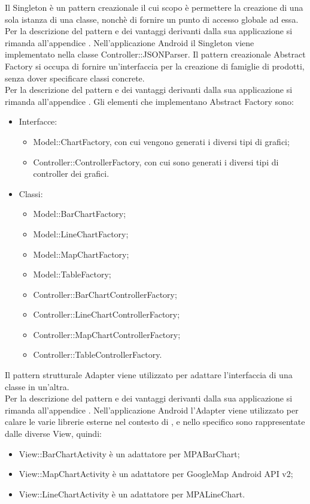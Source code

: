 	Il Singleton è un pattern creazionale il cui scopo è permettere la creazione di una sola istanza di una classe, nonchè di fornire un punto di accesso globale ad essa.\\
	Per la descrizione del pattern e dei vantaggi derivanti dalla sua applicazione si rimanda all'appendice .
	Nell'applicazione Android il Singleton viene implementato nella classe Controller::JSONParser.
	Il pattern creazionale Abstract Factory si occupa di fornire un'interfaccia per la creazione di famiglie di prodotti, senza dover specificare classi concrete. \\
	Per la descrizione del pattern e dei vantaggi derivanti dalla sua applicazione si rimanda all'appendice .
	Gli elementi che implementano Abstract Factory sono:
	\begin{itemize}
	\item Interfacce:
		\begin{itemize}
			\item Model::ChartFactory, con cui vengono generati i diversi tipi di grafici;
			\item Controller::ControllerFactory, con cui sono generati i diversi tipi di controller dei grafici.
		\end{itemize}
	\item Classi:
		\begin{itemize}
			\item Model::BarChartFactory;
			\item Model::LineChartFactory;
			\item Model::MapChartFactory;
			\item Model::TableFactory;
			\item Controller::BarChartControllerFactory;
			\item Controller::LineChartControllerFactory;
			\item Controller::MapChartControllerFactory;
			\item Controller::TableControllerFactory.
		\end{itemize}
	\end{itemize}
	Il pattern strutturale Adapter viene utilizzato per adattare l'interfaccia di una classe in un'altra.\\
	Per la descrizione del pattern e dei vantaggi derivanti dalla sua applicazione si rimanda all'appendice .
	Nell'applicazione Android l'Adapter viene utilizzato per calare le varie librerie esterne nel contesto di \projectname{}, e nello specifico sono rappresentate dalle diverse View, quindi:
	\begin{itemize}
	\item View::BarChartActivity è un adattatore per MPABarChart;
	\item View::MapChartActivity è un adattatore per GoogleMap Android API v2;
	\item View::LineChartActivity è un adattatore per MPALineChart.
	\end{itemize}
	
		
		
		
